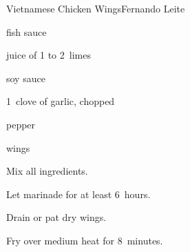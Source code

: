 \begin{recipe}{Vietnamese Chicken Wings}{Fernando Leite}{}

\begin{ingredients}
\item {} fish sauce
\item juice of 1 to 2~limes
\item {} soy sauce
\item 1~clove of garlic, chopped
\item pepper
\item {} wings
\end{ingredients}

\begin{directions}
\item Mix all ingredients.
\item Let marinade for at least 6~hours.
\item Drain or pat dry wings.
\item Fry over medium heat for 8~minutes.
\end{directions}

\end{recipe}
